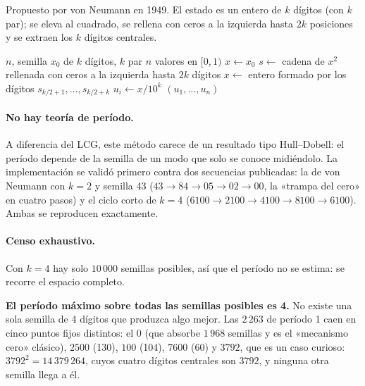 Propuesto por von Neumann en 1949. El estado es un entero de $k$ dígitos (con
$k$ par); se eleva al cuadrado, se rellena con ceros a la izquierda hasta $2k$
posiciones y se extraen los $k$ dígitos centrales.

\begin{algorithm}[H]
\caption{Cuadrados medios (von Neumann)}
\begin{algorithmic}[1]
\Require $n$, semilla $x_0$ de $k$ dígitos, $k$ par
\Ensure $n$ valores en $[0,1)$
\State $x \gets x_0$
  \State $s \gets$ cadena de $x^2$ rellenada con ceros a la izquierda hasta $2k$ dígitos
  \State $x \gets$ entero formado por los dígitos $s_{k/2+1}, \dots, s_{k/2+k}$
  \State $u_i \gets x / 10^{k}$
\EndFor
\State \Return $(u_1,\dots,u_n)$
\end{algorithmic}
\end{algorithm}

\paragraph{No hay teoría de período.} A diferencia del LCG, este método carece
de un resultado tipo Hull--Dobell: el período depende de la semilla de un modo
que solo se conoce midiéndolo. La implementación se validó primero contra dos
secuencias publicadas: la de von Neumann con $k=2$ y semilla 43
($43 \to 84 \to 05 \to 02 \to 00$, la «trampa del cero» en cuatro pasos) y el
ciclo corto de $k=4$ ($6100 \to 2100 \to 4100 \to 8100 \to 6100$). Ambas se
reproducen exactamente.

\paragraph{Censo exhaustivo.} Con $k=4$ hay solo $10\,000$ semillas posibles,
así que el período no se estima: se recorre el espacio completo.

\begin{table}[H]
\centering\small

\caption{Período de las $10\,000$ semillas de 4 dígitos. Barrido exhaustivo.}
\label{tab:cm-censo}
\end{table}

\textbf{El período máximo sobre todas las semillas posibles es 4.} No existe
una sola semilla de 4 dígitos que produzca algo mejor. Las $2\,263$ de período
1 caen en cinco puntos fijos distintos: el $0$ (que absorbe $1\,968$ semillas y
es el «mecanismo cero» clásico), $2500$ (130), $100$ (104), $7600$ (60) y
$3792$, que es un caso curioso: $3792^2 = 14\,379\,264$, cuyos cuatro dígitos
centrales son $3792$, y ninguna otra semilla llega a él.

